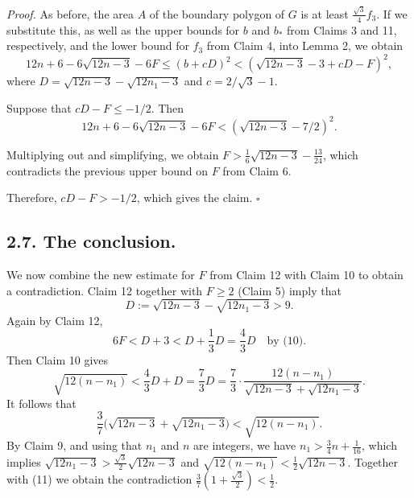 \documentclass{article}
\begin{document}
\textit{Proof.} As before, the area $A$ of the boundary polygon of $G$ is at least $\frac{\sqrt{3}}{4} f_{3}$. If we substitute this, as well as the upper bounds for $b$ and $b_{*}$ from Claims 3 and 11, respectively, and the lower bound for $f_{3}$ from Claim 4, into Lemma 2, we obtain 
\begin{equation*}
12n + 6 - 6\sqrt{12n-3} - 6F \le (b + cD)^2 < (\sqrt{12n-3} - 3 + cD - F)^2,
\end{equation*} where $D = \sqrt{12n - 3} - \sqrt{12n_{1} - 3}$ and $c = 2/\sqrt{3} - 1$.

Suppose that $cD - F \le - 1/2$. Then 
\begin{equation*}
12n + 6 - 6\sqrt{12n-3} - 6F < (\sqrt{12n-3} - 7/2)^2.
\end{equation*}

Multiplying out and simplifying, we obtain $F > \frac{1}{6}\sqrt{12n - 3} - \frac{13}{24}$, which contradicts the previous upper bound on $F$ from Claim 6.

Therefore, $cD - F > - 1/2$, which gives the claim. \hfill$\square$

\subsection*{2.7. The conclusion.}

We now combine the new estimate for $F$ from Claim 12 with Claim 10 to obtain a contradiction. Claim 12 together with $F \ge 2$ (Claim 5) imply that 
\begin{equation*}
D := \sqrt{12n-3} - \sqrt{12n_1-3} > 9. \tag{10}
\end{equation*} Again by Claim 12, 
\begin{equation*}
6F < D + 3 < D + \frac{1}{3}D = \frac{4}{3}D \quad\text{by (10)}.
\end{equation*} Then Claim 10 gives 
\begin{equation*}
\sqrt{12(n-n_1)} < \frac{4}{3}D + D = \frac{7}{3}D = \frac{7}{3}\cdot\frac{12(n-n_1)}{\sqrt{12n-3} + \sqrt{12n_1-3}}.
\end{equation*} It follows that 
\begin{equation*}
\frac{3}{7}\bigl(\sqrt{12n-3} + \sqrt{12n_1-3}\bigr) < \sqrt{12(n-n_1)}. \tag{11}
\end{equation*} By Claim 9, and using that $n_{1}$ and $n$ are integers, we have $n_{1} > \frac{3}{4}n + \frac{1}{16}$, which implies $\sqrt{12n_{1} - 3} > \frac{\sqrt{3}}{2}\sqrt{12n - 3}$ and $\sqrt{12(n - n_{1})} < \frac{1}{2}\sqrt{12n - 3}$. Together with (11) we obtain the contradiction $\frac{3}{7}(1 + \frac{\sqrt{3}}{2}) < \frac{1}{2}$.
\end{document}
